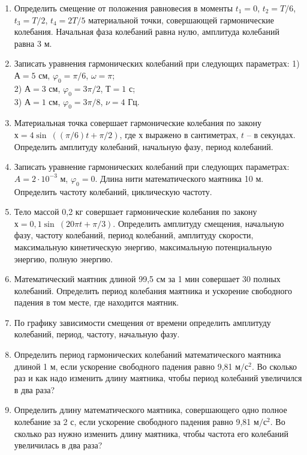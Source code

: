 \documentclass[a5paper, 10pt]{diss_4}
\renewcommand{\'}{\,'}
\begin{document}
\begin{enumerate}
\item Определить смещение от положения равновесия в моменты $t_1=0$, $t_2=T/6$, $t_3=T/2$, $t_4=2T/5$ материальной точки, совершающей гармонические колебания. Начальная фаза колебаний равна нулю, амплитуда колебаний равна 3 м.

\item Записать уравнения гармонических колебаний при следующих параметрах:
1) $А=5$ см, $\varphi_0= \pi/6$, $\omega=\pi$; \\
2) $А=3$ см, $\varphi_0= 3\pi/2$, $Т=1$ с; \\
3) $А=1$ см, $\varphi_0= 3\pi/8$,   $\nu=4$ Гц.

\item Материальная точка совершает гармонические колебания по закону $х=4\sin\ ((\pi/6)t+\pi/2)$, где $х$ выражено в сантиметрах, $t$ -- в секундах. Определить амплитуду колебаний, начальную фазу, период колебаний.

\item Записать уравнение гармонических колебаний при следующих параметрах: $A=2\cdot10^{-3}$ м, $\varphi_0=0$. Длина нити математического маятника 10 м.  Определить частоту колебаний, циклическую частоту.

\item Тело массой 0,2 кг совершает гармонические колебания по закону $х=0,1\sin\ (20\pi t+\pi/3)$. Определить амплитуду смещения, начальную фазу, частоту колебаний, период колебаний, амплитуду скорости, максимальную кинетическую энергию, максимальную потенциальную энергию, полную энергию.

\item Математический маятник длиной 99,5 см за 1 мин совершает 30 полных колебаний. Определить период колебания маятника и ускорение свободного падения в том месте, где находится маятник.

\item По графику зависимости смещения от времени определить амплитуду колебаний, период, частоту, начальную фазу.

\item Определить период гармонических колебаний математического маятника длиной 1 м, если ускорение свободного падения равно 9,81 $м/с^2$. Во сколько раз и как надо изменить длину маятника, чтобы период колебаний увеличился в два раза?

\item Определить длину математического маятника, совершающего одно полное колебание за 2 с, если ускорение свободного падения равно 9,81 $м/с^2$. Во сколько раз нужно изменить длину маятника, чтобы частота его колебаний увеличилась в два раза?


\end{enumerate}
\end{document}
